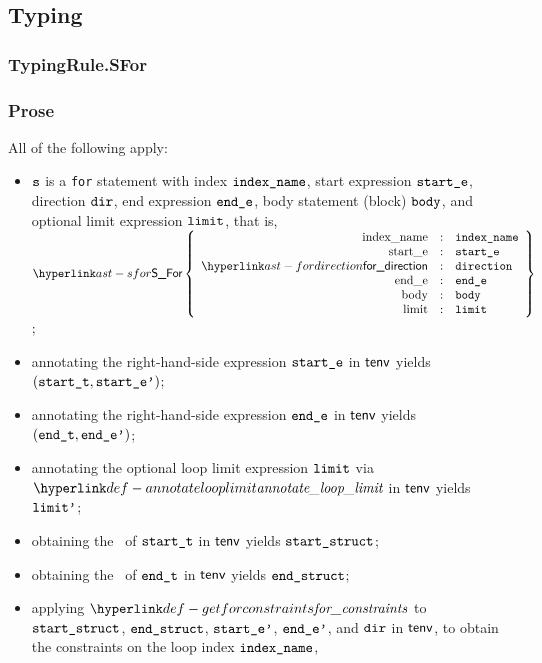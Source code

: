 \subsection{Typing}
\subsubsection{TypingRule.SFor \label{sec:TypingRule.SFor}}
\subsubsection{Prose}
All of the following apply:
\begin{itemize}
  \item $\texttt{s}$ is a \texttt{for} statement with index $\texttt{index\_name}$,
        start expression $\texttt{start\_e}$,
        direction $\texttt{dir}$,
        end expression $\texttt{end\_e}$,
        body statement (block) $\texttt{body}$,
        and optional limit expression $\texttt{limit}$,
        that is, $\SFor\left\{\begin{array}{rcl}
          \Forindexname &:& \vindexname\\
          \Forstarte &:& \vstarte\\
          \fordirection &:& \vdirection\\
          \Forende &:& \vende\\
          \Forbody &:& \vbody\\
          \Forlimit &:& \vlimit
        \end{array}\right\}$;
  \item annotating the right-hand-side expression $\texttt{start\_e}$ in $\textsf{tenv}$ yields \\
        $(\texttt{start\_t}, \texttt{start\_e'})$\ProseOrTypeError;
  \item annotating the right-hand-side expression $\texttt{end\_e}$ in $\textsf{tenv}$ yields $(\texttt{end\_t}, \texttt{end\_e'})$\ProseOrTypeError;
  \item annotating the optional loop limit expression $\texttt{limit}$ via $\annotatelooplimit$ in $\textsf{tenv}$
        yields $\texttt{limit'}$\ProseOrTypeError;
  \item obtaining the \underlyingtype\ of $\texttt{start\_t}$ in $\textsf{tenv}$ yields $\texttt{start\_struct}$\ProseOrTypeError;
  \item obtaining the \underlyingtype\ of $\texttt{end\_t}$ in $\textsf{tenv}$ yields $\texttt{end\_struct}$\ProseOrTypeError;
  \item applying $\getforconstraints$ to $\texttt{start\_struct}$, $\texttt{end\_struct}$,
        $\texttt{start\_e'}$, $\texttt{end\_e'}$, and $\texttt{dir}$ in $\textsf{tenv}$,
        to obtain the constraints on the loop index $\texttt{index\_name}$,

\end{itemize}
